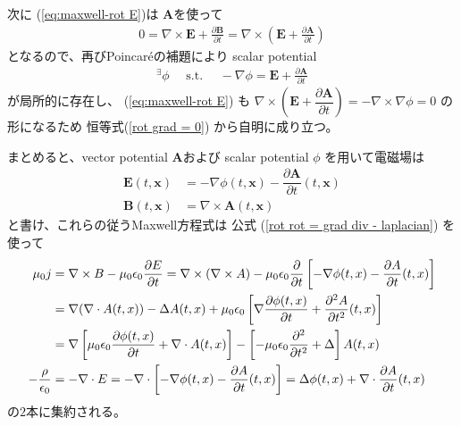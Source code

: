 次に
(\ref{eq:maxwell-rot E})は
$\bm{A}$を使って
\begin{align}
  0 =
  \nabla \times \bm{E}
  +
  \frac{\partial \bm{B}}
    {\partial t}
=
  \nabla \times
  \left(
    \bm{E}
    +
    \frac{\partial \bm{A}}
      {\partial t}      
  \right)
\end{align}
となるので、再びPoincar\'eの補題により
scalar potential
\begin{align}
  {}^\exists \phi
\quad
\text{ s.t. }
\quad
  - \nabla \phi
=
  \bm{E}
  +
  \frac{\partial \bm{A}}
    {\partial t}
\end{align}
が局所的に存在し、
(\ref{eq:maxwell-rot E})
も
$\nabla \times
\left(
  \bm{E} +
  \dfrac{\partial \bm{A}}
    {\partial t}
\right)
= - \nabla \times \nabla \phi
= 0$
の形になるため
恒等式(\ref{rot grad = 0})
から自明に成り立つ。

まとめると、vector potential
$\bm{A}$および
scalar potential $\phi$
を用いて電磁場は
\begin{subequations}
\begin{align}
  \bm{E} (t, \bm{x})
&=
  - \nabla \phi (t, \bm{x})
  - \dfrac{\partial \bm{A}}
    {\partial t} (t, \bm{x})
\\
  \bm{B} (t, \bm{x})
&=
  \nabla \times
  \bm{A} (t, \bm{x})
\end{align}
\end{subequations}
と書け、これらの従うMaxwell方程式は
公式
(\ref{rot rot = grad div - laplacian})
を使って
\begin{subequations}
\begin{align}
  \mu_0 j
&=
  \nabla \times B
  -
  \mu_0 \epsilon_0
    \frac{\partial E}
      {\partial t}
=
  \nabla \times
    (\nabla \times A)
  -
  \mu_0 \epsilon_0
    \frac{\partial}{\partial t}
  \left[
    - \nabla \phi (t, x)
    - \dfrac{\partial A}
      {\partial t} (t, x)
  \right]
\notag\\&
=
  \nabla
    (\nabla \cdot A (t, x))
  -
    \Delta A (t, x)
  +
  \mu_0 \epsilon_0
  \left[
    \nabla
    \frac{\partial \phi (t, x)}
      {\partial t}
  +
    \dfrac{\partial^2 A}
      {\partial t^2} (t, x)
  \right]
\notag\\&
=
  \nabla
  \left[
    \mu_0 \epsilon_0
    \frac{\partial \phi (t, x)}
      {\partial t}
  +
    \nabla \cdot
      A (t, x)
  \right]
  -
  \left[
    - \mu_0 \epsilon_0
    \dfrac{\partial^2}{\partial t^2}
  +
    \Delta
  \right]
    A (t, x)
\\
  - \frac{\rho}{\epsilon_0}
&=
  - \nabla \cdot E
=
  - \nabla \cdot
  \left[
    - \nabla \phi (t, x)
    - \dfrac{\partial A}
      {\partial t} (t, x)
  \right]
=
  \Delta \phi (t, x)
  +
    \nabla \cdot
    \dfrac{\partial A}
      {\partial t} (t, x)
\end{align}
\label{maxwell eq of potentials}
\end{subequations}
の$2$本に集約される。

